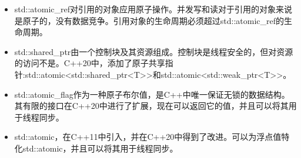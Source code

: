 \begin{tcolorbox}[breakable,enhanced jigsaw,colback=mygreen!5!white,colframe=mygreen!75!black,title={总结}]
	
\begin{itemize}
\item 
std::atomic\_ref对引用的对象应用原子操作。并发写和读对于引用的对象来说是原子的，没有数据竞争。引用对象的生命周期必须超过std::atomic\_ref的生命周期。

\item 
std::shared\_ptr由一个控制块及其资源组成。控制块是线程安全的，但对资源的访问不是。C++20中，添加了原子共享指针:std::atomic<std::shared\_ptr<T>{}>和std::atomic<std::weak\_ptr<T>{}>。

\item 
std::atomic\_flag作为一种原子布尔值，是C++中唯一保证无锁的数据结构。其有限的接口在C++20中进行了扩展，现在可以返回它的值，并且可以将其用于线程同步。

\item 
std::atomic，在C++11中引入，并在C++20中得到了改进。可以为浮点值特化std::atomic，并且可以将其用于线程同步。
\end{itemize}
	
\end{tcolorbox}

\newpage








